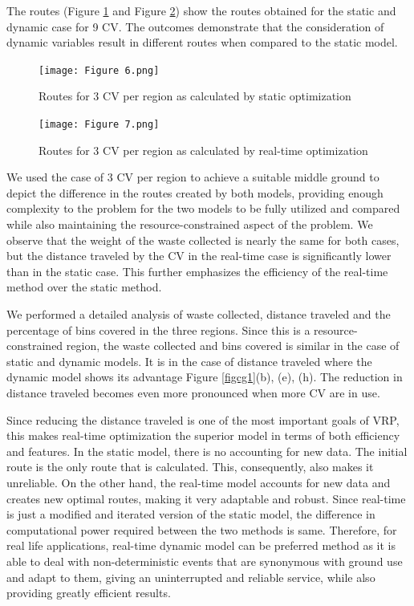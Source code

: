 \documentclass[12pt]{article}
\begin{document}
The routes (Figure \ref{fig4} and Figure \ref{fig5}) show the routes obtained for the static and dynamic case for 9 CV. The outcomes demonstrate that the consideration of dynamic variables result in different routes when compared to the static model.

\begin{figure}[H]
    \centering
    \texttt{[image: Figure 6.png]} %
    \caption{Routes for 3 CV per region as calculated by static optimization}\label{fig4}
\end{figure}
\begin{figure}[H]
    \centering
    \texttt{[image: Figure 7.png]} %
    \caption{Routes for 3 CV per region as calculated by real-time optimization}\label{fig5}
\end{figure}


We used the case of 3 CV per region to achieve a suitable middle ground to depict the difference in the routes created by both models, providing enough complexity to the problem for the two models to be fully utilized and compared while also maintaining the resource-constrained aspect of the problem. We observe that the weight of the waste collected is nearly the same for both cases, but the distance traveled by the CV in the real-time case is significantly lower than in the static case. This further emphasizes the efficiency of the real-time method over the static method.

We performed a detailed analysis of waste collected, distance traveled and the percentage of bins covered in the three regions. Since this is a resource-constrained region, the waste collected and bins covered is similar in the case of static and dynamic models. It is in the case of distance traveled where the dynamic model shows its advantage {Figure \ref{figcg1}(b), (e), (h)}. The reduction in distance traveled becomes even more pronounced when more CV are in use.

Since reducing the distance traveled is one of the most important goals of VRP, this makes real-time optimization the superior model in terms of both efficiency and features. In the static model, there is no accounting for new data. The initial route is the only route that is calculated. This, consequently, also makes it unreliable. On the other hand, the real-time model accounts for new data and creates new optimal routes, making it very adaptable and robust. Since real-time is just a modified and iterated version of the static model, the difference in computational power required between the two methods is same. Therefore, for real life applications, real-time dynamic model can be preferred method as it is able to deal with non-deterministic events that are synonymous with ground use and adapt to them, giving an uninterrupted and reliable service, while also providing greatly efficient results.
\end{document}
